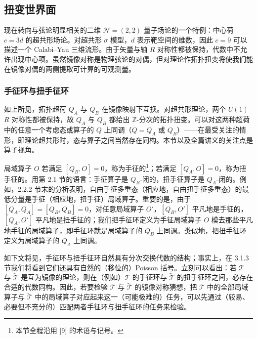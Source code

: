 
\subsection{扭变世界面}

现在转向与弦论明显相关的二维 $\mathcal{N}=(2,2)$ 量子场论的一个特例：中心荷 $c=3d$ 的超共形场论。对超共形 $\sigma$ 模型，$d$ 表示靶空间的维数，因此 $c=9$ 可以描述一个 Calabi--Yau 三维流形。由于矢量与轴 $R$ 对称性都被保持，代数中不允许出现中心项。虽然镜像对称是物理弦论的对偶，但对理论作拓扑扭变将使我们能在镜像对偶的两侧提取可计算的可观测量。

\subsubsection{手征环与扭手征环}

如上所见，拓扑超荷 $Q_A$ 与 $Q_B$ 在镜像映射下互换。对超共形理论，两个 $U(1)$ $R$ 对称性都被保持，故 $Q_A$ 与 $Q_B$ 都给出 $\mathbb{Z}$-分次的拓扑扭变。可以对这两种超荷中的任意一个考虑态或算子的 $Q$ 上同调（$Q=Q_A$ 或 $Q_B$）——在最受关注的情形，即理论超共形时，态与算子之间当然存在同构。本节以及全篇讲义的关注点是算子视角。

局域算子 $O$ 若满足 $[Q_B,O]=0$，称为手征的\footnote{本节全程沿用 [9] 的术语与记号。}；若满足 $[Q_A,O]=0$，称为扭手征的。用第 2.1 节的语言：手征算子是 $Q_B$-闭的，扭手征算子是 $Q_A$-闭的。例如，2.2.2 节末的分析表明，自由手征多重态（相应地，自由扭手征多重态）的最低分量是手征（相应地，扭手征）局域算子。重要的是，由于 $[Q_A,Q_A]=[Q_B,Q_B]=0$，对任意局域算子 $O'$，$[Q_B,O']$ 平凡地是手征的，$[Q_A,O']$ 平凡地是扭手征的；我们把手征环定义为手征局域算子 $O$ 模去那些平凡地手征的局域算子，即手征环就是局域算子的 $Q_B$ 上同调。类似地，把扭手征环定义为局域算子的 $Q_A$ 上同调。

如下文将见，手征环与扭手征环自然具有分次交换代数的结构；事实上，在 3.1.3 节我们将看到它们还具有自然的（移位的）Poisson 括号。立刻可以看出：若 $\mathcal{T}$ 与 $\tilde{\mathcal{T}}$ 是互为镜像的理论，则在（例如）$\mathcal{T}$ 的手征环与 $\tilde{\mathcal{T}}$ 的扭手征环之间，必存在合适的代数同构。因此，若要检验 $\mathcal{T}$ 与 $\tilde{\mathcal{T}}$ 的镜像对称猜想，把 $\mathcal{T}$ 中的全部局域算子与 $\tilde{\mathcal{T}}$ 中的局域算子对应起来这一（可能极难的）任务，可以先通过（较易、必要但不充分的）匹配两者手征环与扭手征环的任务来检验。

